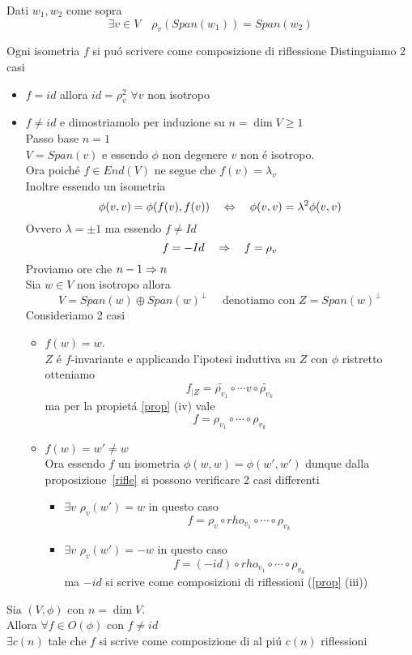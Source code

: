 \begin{cor}Dati $w_1, w_2 $ come sopra 
$$ \exists v \in V \quad \rho_v(Span(w_1) ) = Span(w_2) $$
\end{cor}
\newpage
\begin{thm}\bianco
Ogni isometria $f$ si pu\'o scrivere come composizione di riflessione 
\proof
Distinguiamo 2 casi 
\begin{itemize}
\item $f=id$ allora $id = \rho^2_v $ $\forall v $ non isotropo
\item $f \neq id $ e dimostriamolo per induzione su $n = \dim V \geq 1 $\\
Passo base $n=1 $ \\$V = Span (v) $ e essendo  $\phi $ non degenere $v$ non \'e isotropo.\\
Ora poich\'e $f \in End(V) $ ne segue che $ f(v)=\lambda_v $\\
Inoltre essendo un isometria
$$ \phi(v,v) = \phi(f(v),f(v)) \quad \Leftrightarrow \quad \phi(v,v) = \lambda^2 \phi(v,v)$$
Ovvero $\lambda=\pm 1 $ ma essendo $f\neq Id $ 
$$ f = -Id \quad \Rightarrow \quad f=\rho_v$$
Proviamo ore che $n-1 \Rightarrow n $\\
Sia $ w \in  V $ non isotropo allora
$$ V = Span(w) \oplus Span(w)^\perp \quad \text{  denotiamo con } Z= Span(w)^\perp $$
Consideriamo 2 casi
\begin{itemize}
\item $f(w)=w$.\\
 $Z$ \'e $f$-invariante e  applicando l'ipotesi induttiva su $ Z $ con $\phi $ ristretto otteniamo 
$$ f_{\vert Z } = \tilde{ \rho_{v_1}} \circ \cdots v\circ  \tilde{ \rho_{v_k}}$$ ma per la propiet\'a \ref{prop} (iv) vale $$ f= \rho_{v_1} \circ \cdots \circ \rho_{v_k}$$
\item $f(w) = w' \neq w$\\
Ora essendo $f$ un isometria $\phi(w,w)=\phi(w',w')$ dunque dalla proposizione~\ref{rifle} si possono verificare 2 casi differenti
\begin{itemize}


\item $\exists v $ $ \rho_v(w')= w $ in questo caso $$ f= \rho_v \circ rho_{v_1} \circ \cdots \circ \rho_{v_k}$$
\item $\exists v $ $ \rho_v(w')= -w $ in questo caso $$ f= (-id) \circ rho_{v_1} \circ \cdots \circ \rho_{v_k}$$
ma $-id $ si scrive come composizioni di riflessioni (\ref{prop} (iii))
\end{itemize}
\end{itemize}
\end{itemize}

\endproof
\end{thm}
\begin{cor} Sia $(V, \phi ) $ con $n=\dim V $.\\
Allora  $\forall f \in O(\phi) $ con $f \neq id $\\ $\exists c(n) $ tale che $f$ si scrive come composizione di al pi\'u $c(n)$ riflessioni
\end{cor}
\newpage
